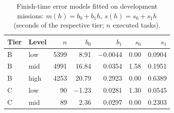 \begin{table}[t]
\caption{Finish-time error models fitted on development missions: $m(h)=b_0+b_1h$, $s(h)=s_0+s_1h$ (seconds of the respective tier; $n$ executed tasks).}\label{tab:errmodels}
\centering\small
\begin{tabular}{llrrrrr}
\toprule
Tier & Level & $n$ & $b_0$ & $b_1$ & $s_0$ & $s_1$ \\
\midrule
B & low & 5399 & 8.91 & $-$0.0044 & 0.00 & 0.0904 \\
B & mid & 4991 & 16.84 & 0.0354 & 1.58 & 0.1951 \\
B & high & 4253 & 20.79 & 0.2923 & 0.00 & 0.6389 \\
C & low & 90 & $-$1.23 & 0.0281 & 1.30 & 0.0545 \\
C & mid & 89 & 2.36 & 0.0297 & 0.00 & 0.2303 \\
\bottomrule
\end{tabular}
\end{table}
